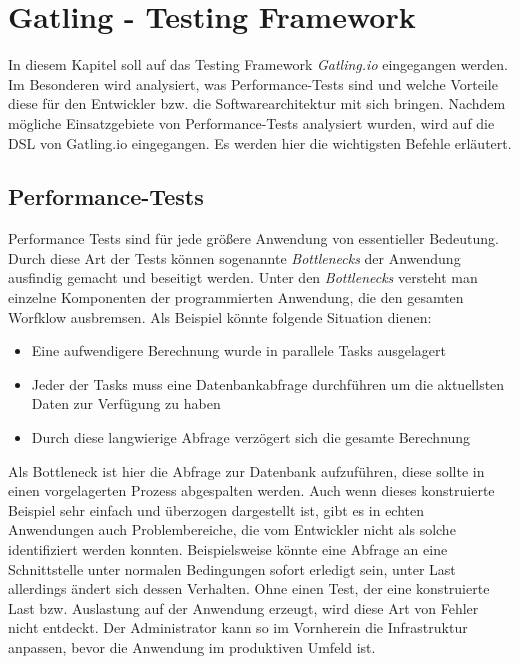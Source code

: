 \chapter{Gatling - Testing Framework}

In diesem Kapitel soll auf das Testing Framework \textit{Gatling.io} eingegangen werden. Im Besonderen wird analysiert, was Performance-Tests sind und welche Vorteile diese für den Entwickler bzw. die Softwarearchitektur mit sich bringen.
\newline
Nachdem mögliche Einsatzgebiete von Performance-Tests analysiert wurden, wird auf die \ac{DSL} von Gatling.io eingegangen. Es werden hier die wichtigsten Befehle erläutert.


\section{Performance-Tests}

Performance Tests sind für jede größere Anwendung von essentieller Bedeutung. Durch diese Art der Tests können sogenannte \textit{Bottlenecks} der Anwendung ausfindig gemacht und beseitigt werden. Unter den \textit{Bottlenecks} versteht man einzelne Komponenten der programmierten Anwendung, die den gesamten Worfklow ausbremsen. Als Beispiel könnte folgende Situation dienen:
\begin{itemize}
    \item Eine aufwendigere Berechnung wurde in parallele Tasks ausgelagert
    \item Jeder der Tasks muss eine Datenbankabfrage durchführen um die aktuellsten Daten zur Verfügung zu haben
    \item Durch diese langwierige Abfrage verzögert sich die gesamte Berechnung
\end{itemize}
Als Bottleneck ist hier die Abfrage zur Datenbank aufzuführen, diese sollte in einen vorgelagerten Prozess abgespalten werden. Auch wenn dieses konstruierte Beispiel sehr einfach und überzogen dargestellt ist, gibt es in echten Anwendungen auch Problembereiche, die vom Entwickler nicht als solche identifiziert werden konnten. Beispielsweise könnte eine Abfrage an eine Schnittstelle unter normalen Bedingungen sofort erledigt sein, unter Last allerdings ändert sich dessen Verhalten. Ohne einen Test, der eine konstruierte Last bzw. Auslastung auf der Anwendung erzeugt, wird diese Art von Fehler nicht entdeckt. Der Administrator kann so im Vornherein die Infrastruktur anpassen, bevor die Anwendung im produktiven Umfeld ist.
 
